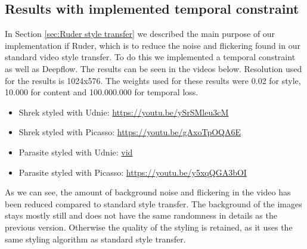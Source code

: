\subsection{Results with implemented temporal constraint}
\label{seq:ruder_result}
In Section \ref{sec:Ruder style transfer} we described the main purpose of our implementation if Ruder, which is to reduce the noise and flickering found in our standard video style transfer. To do this we implemented a temporal constraint as well as Deepflow. The results can be seen in the videos below.\newline
Resolution used for the results is 1024x576.\newline
The weights used for these results were 0.02 for style, 10.000 for content and 100.000.000 for temporal loss. 
\begin{itemize}
\item{Shrek styled with Udnie: \url{https://youtu.be/ySrSMleu3cM}}
\item{Shrek styled with Picasso: \url{https://youtu.be/gAxoTpOQA6E}}
\item{Parasite styled with Udnie: \url{vid}}
\item{Parasite styled with Picasso: \url{https://youtu.be/y5xqQGA3bOI}}
\end{itemize}
As we can see, the amount of background noise and flickering in the video has been reduced compared to standard style transfer. The background of the images stays mostly still and does not have the same randomness in details as the previous version. Otherwise the quality of the styling is retained, as it uses the same styling algorithm as standard style transfer.
